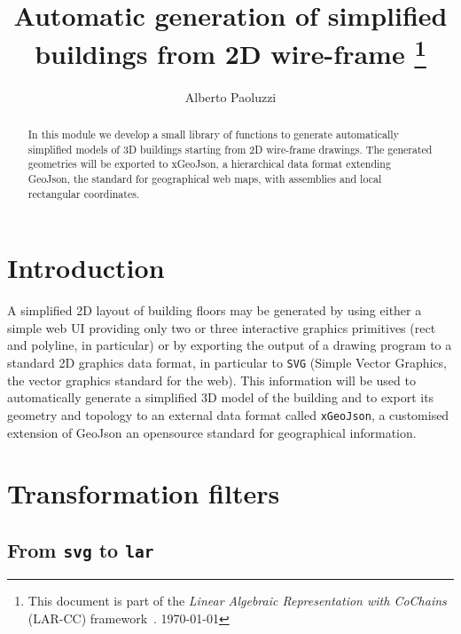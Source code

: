 \documentclass[11pt,oneside]{article}    %
\title{Automatic generation of simplified buildings from 2D wire-frame
\footnote{This document is part of the \emph{Linear Algebraic Representation with CoChains} (LAR-CC) framework~\cite{cclar-proj:2013:00}. \today}
}
\author{Alberto Paoluzzi}
\begin{document}
\maketitle
\nonstopmode

\begin{abstract}
In this module we develop a small library of functions to generate automatically simplified models of 3D buildings starting from 2D wire-frame drawings. The generated geometries will be exported to xGeoJson, a hierarchical data format extending GeoJson, the standard for geographical web maps, with assemblies and local rectangular coordinates. 
\end{abstract}

\tableofcontents

\section{Introduction}

A simplified 2D layout of building floors may be generated by using either a simple web UI providing only two or three interactive graphics primitives (rect and polyline, in particular) or by exporting the output of a drawing program to a standard 2D graphics data format, in particular to \texttt{SVG} (Simple Vector Graphics, the vector graphics standard for the web). This information will be used to automatically generate a simplified 3D model of the building and to export its geometry and topology to an external data format called \texttt{xGeoJson}, a customised extension of GeoJson an opensource standard for geographical information.


\section{Transformation filters}

\subsection{From \texttt{svg} to \texttt{lar}}
\end{document}
